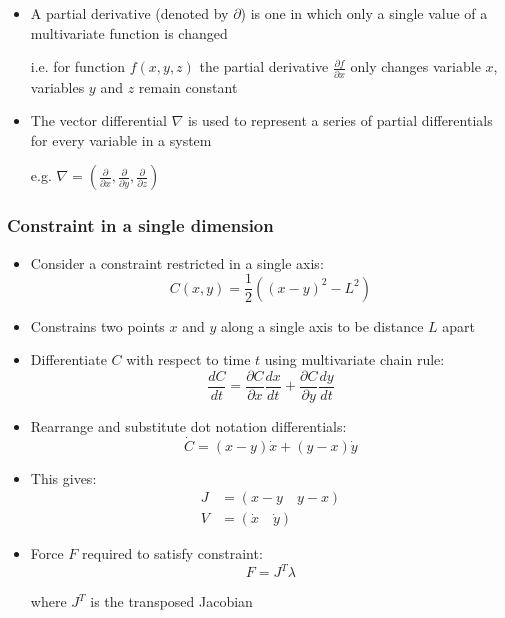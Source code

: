\documentclass[a4paper]{article}
\begin{document}
\begin{itemize}
  \item
    A partial derivative (denoted by $\partial$) is one in which only a single
    value of a multivariate function is changed

    i.e. for function $f(x, y, z)$ the partial derivative $\frac{\partial
    f}{\partial x}$ only changes variable $x$, variables $y$ and $z$ remain
    constant

  \item
    The vector differential $\nabla$ is used to represent a series of partial
    differentials for every variable in a system

    e.g. $\nabla = \left(
                      \frac{\partial}{\partial x},
                      \frac{\partial}{\partial y},
                      \frac{\partial}{\partial z}
                   \right)$

\end{itemize}

\subsubsection{Constraint in a single dimension}

\begin{itemize}
  \item
    Consider a constraint restricted in a single axis:
    \[
      C(x, y) = \frac{1}{2} \left((x - y)^{2} - L^{2}\right)
    \]

  \item
    Constrains two points $x$ and $y$ along a single axis to be distance $L$
    apart

  \item
    Differentiate $C$ with respect to time $t$ using multivariate chain rule:
    \[
      \frac{dC}{dt} = \frac{\partial C}{\partial x} \frac{dx}{dt} +
                      \frac{\partial C}{\partial y} \frac{dy}{dt}
    \]

  \item
    Rearrange and substitute dot notation differentials:
    \[
      \dot C = (x - y) \dot x + (y - x) \dot y
    \]

  \item
    This gives:
    \begin{align*}
      J &= (x-y \quad y-x) \\
      V &= (\dot x \quad \dot y)
    \end{align*}

  \item
    Force $F$ required to satisfy constraint:
    \[
      F = J^{T} \lambda
    \]

    where $J^{T}$ is the transposed Jacobian

\end{itemize}
\end{document}
